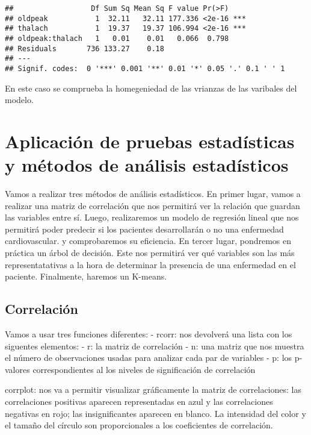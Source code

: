 \documentclass[
]{article}
\begin{document}
\begin{verbatim}
##                  Df Sum Sq Mean Sq F value Pr(>F)    
## oldpeak           1  32.11   32.11 177.336 <2e-16 ***
## thalach           1  19.37   19.37 106.994 <2e-16 ***
## oldpeak:thalach   1   0.01    0.01   0.066  0.798    
## Residuals       736 133.27    0.18                   
## ---
## Signif. codes:  0 '***' 0.001 '**' 0.01 '*' 0.05 '.' 0.1 ' ' 1
\end{verbatim}

En este caso se comprueba la homegeniedad de las vrianzas de las
varibales del modelo.

\hypertarget{aplicaciuxf3n-de-pruebas-estaduxedsticas-y-muxe9todos-de-anuxe1lisis-estaduxedsticos}{%
\section{Aplicación de pruebas estadísticas y métodos de análisis
estadísticos}\label{aplicaciuxf3n-de-pruebas-estaduxedsticas-y-muxe9todos-de-anuxe1lisis-estaduxedsticos}}

Vamos a realizar tres métodos de análisis estadísticos. En primer lugar,
vamos a realizar una matriz de correlación que nos permitirá ver la
relación que guardan las variables entre sí. Luego, realizaremos un
modelo de regresión lineal que nos permitirá poder predecir si los
pacientes desarrollarán o no una enfermedad cardiovascular. y
comprobaremos su eficiencia. En tercer lugar, pondremos en práctica un
árbol de decisión. Este nos permitirá ver qué variables son las más
representatativas a la hora de determinar la presencia de una enfermedad
en el paciente. Finalmente, haremos un K-means.

\hypertarget{correlaciuxf3n}{%
\subsection{Correlación}\label{correlaciuxf3n}}

Vamos a usar tres funciones diferentes: - rcorr: nos devolverá una lista
con los siguentes elementos: - r: la matriz de correlación - n: una
matriz que nos muestra el número de observaciones usadas para analizar
cada par de variables - p: los p-valores correspondientes al los niveles
de significación de correlación

corrplot: nos va a permitir visualizar gráficamente la matriz de
correlaciones: las correlaciones positivas aparecen representadas en
azul y las correlaciones negativas en rojo; las insignificantes aparecen
en blanco. La intensidad del color y el tamaño del círculo son
proporcionales a los coeficientes de correlación.
\end{document}
